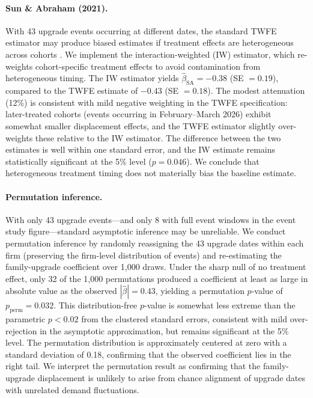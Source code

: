 \documentclass[11pt, a4paper]{article}
\begin{document}
\paragraph{Sun \& Abraham (2021).} With 43 upgrade events occurring at different dates, the standard TWFE estimator may produce biased estimates if treatment effects are heterogeneous across cohorts \citep{dechaisemartin2020twoway, goodmanbacon2021}. We implement the \citet{sunAbraham2021} interaction-weighted (IW) estimator, which re-weights cohort-specific treatment effects to avoid contamination from heterogeneous timing. The IW estimator yields $\hat{\beta}_{\text{SA}} = -0.38$ (SE $= 0.19$), compared to the TWFE estimate of $-0.43$ (SE $= 0.18$). The modest attenuation (12\%) is consistent with mild negative weighting in the TWFE specification: later-treated cohorts (events occurring in February--March 2026) exhibit somewhat smaller displacement effects, and the TWFE estimator slightly over-weights these relative to the IW estimator. The difference between the two estimates is well within one standard error, and the IW estimate remains statistically significant at the 5\% level ($p = 0.046$). We conclude that heterogeneous treatment timing does not materially bias the baseline estimate.

\paragraph{Permutation inference.} With only 43 upgrade events---and only 8 with full event windows in the event study figure---standard asymptotic inference may be unreliable. We conduct permutation inference by randomly reassigning the 43 upgrade dates within each firm (preserving the firm-level distribution of events) and re-estimating the family-upgrade coefficient over 1,000 draws. Under the sharp null of no treatment effect, only 32 of the 1,000 permutations produced a coefficient at least as large in absolute value as the observed $|\hat{\beta}| = 0.43$, yielding a permutation $p$-value of $p_{\text{perm}} = 0.032$. This distribution-free $p$-value is somewhat less extreme than the parametric $p < 0.02$ from the clustered standard errors, consistent with mild over-rejection in the asymptotic approximation, but remains significant at the 5\% level. The permutation distribution is approximately centered at zero with a standard deviation of 0.18, confirming that the observed coefficient lies in the right tail. We interpret the permutation result as confirming that the family-upgrade displacement is unlikely to arise from chance alignment of upgrade dates with unrelated demand fluctuations.
\end{document}
